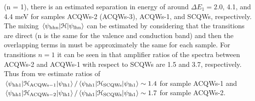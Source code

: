 (n = 1), there is an estimated separation in energy of around $\Delta E_1 = 2.0$, 4.1, and 4.4 meV for samples \gls{ACQWs}-2 (\gls{ACQWs}-3), \gls{ACQWs}-1, and \gls{SCQWs}, respectively. The mixing $\mel{\psi_{\mathrm{hhn}}}{\cal{H}}{\psi_{\mathrm{lhn}}}$ can be estimated by considering that the transitions are direct (n is the same for the valence and conduction band) and then the overlapping terms in  must be approximately the same for each sample.  For transitions $n=1$ it can be seen in  that amplifier ratios of the spectra between ACQWs-2 and ACQWs-1 with respect to SCQWs are 1.5 and 3.7, respectively.  Thus from  we estimate ratios of  $\mel{\psi_{\mathrm{hh1}}}{\cal{H}_{\mathrm{ACQWs-1}}}{\psi_{\mathrm{lh1}}}/\mel{\psi_{\mathrm{hh1}}}{\cal{H}_{\mathrm{SCQWs}}}{\psi_\mathrm{lh1}}\sim 1.4$  for sample \gls{ACQWs}-1 and $\mel{\psi_{\mathrm{hh1}}}{\cal{H}_{\mathrm{ACQWs-2}}}{\psi_{\mathrm{lh1}}}/\mel{\psi_{\mathrm{hh1}}}{\cal{H}_{\mathrm{SCQWs}}}{\psi_\mathrm{lh1}}\sim 1.7$ for sample \gls{ACQWs}-2.
